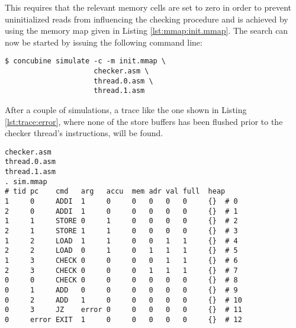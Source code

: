 This requires that the relevant memory cells are set to zero in order to prevent uninitialized reads from influencing the checking procedure and is achieved by using the memory map given in Listing \ref{lst:mmap:init.mmap}.
The search can now be started by issuing the following command line:

\begin{verbatim}
$ concubine simulate -c -m init.mmap \
                     checker.asm \
                     thread.0.asm \
                     thread.1.asm
\end{verbatim}

After a couple of simulations, a trace like the one shown in Listing \ref{lst:trace:error}, where none of the store buffers has been flushed prior to the checker thread's  instructions, will be found.

\begin{lstlisting}[style=asm, caption={Sequentially Inconsistent Trace}, label={lst:trace:error}, xleftmargin=\parindent]
checker.asm
thread.0.asm
thread.1.asm
. sim.mmap
# tid pc    cmd   arg   accu  mem adr val full  heap
1     0     ADDI  1     0     0   0   0   0     {}  # 0
2     0     ADDI  1     0     0   0   0   0     {}  # 1
1     1     STORE 0     1     0   0   0   0     {}  # 2
2     1     STORE 1     1     0   0   0   0     {}  # 3
1     2     LOAD  1     1     0   0   1   1     {}  # 4
2     2     LOAD  0     1     0   1   1   1     {}  # 5
1     3     CHECK 0     0     0   0   1   1     {}  # 6
2     3     CHECK 0     0     0   1   1   1     {}  # 7
0     0     CHECK 0     0     0   0   0   0     {}  # 8
0     1     ADD   0     0     0   0   0   0     {}  # 9
0     2     ADD   1     0     0   0   0   0     {}  # 10
0     3     JZ    error 0     0   0   0   0     {}  # 11
0     error EXIT  1     0     0   0   0   0     {}  # 12
\end{lstlisting}
